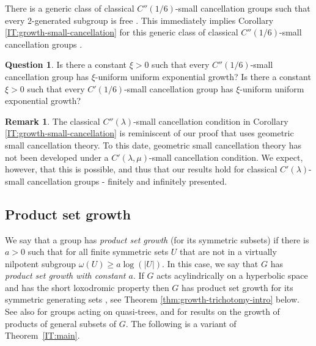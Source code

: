 \documentclass[leqno,a4paper,10pt]{amsart}
\theoremstyle{plain}
\theoremstyle{definition}
\newtheorem{rem}[thm]{Remark}
\newtheorem{quest}[thm]{Question}
\theoremstyle{remark}
\let\ge\geqslant
\begin{document}
There is a generic class of classical $C''(1/6)$-small cancellation groups such that every $2$-generated subgroup is free  \cite{arzhantseva_generality_1996}. This immediately implies Corollary \ref{IT:growth-small-cancellation} for this generic class of classical $C''(1/6)$-small cancellation groups \cite[p. 194]{de_la_harpe_topics_2000}. 

\begin{quest} Is there a constant $\xi>0$ such that every $C''(1/6)$-small cancellation group has $\xi$-uniform uniform exponential growth? Is there a constant $\xi>0$ such that every $C'(1/6)$-small cancellation group has $\xi$-uniform uniform exponential growth? 
\end{quest}

\begin{rem} 
	The classical $C''(\lambda)$-small cancellation condition in Corollary \ref{IT:growth-small-cancellation} is reminiscent of our proof that uses geometric small cancellation theory. To this date, geometric small cancellation theory has not been developed under a  $C'(\lambda,\mu)$-small cancellation condition. We expect, however, that this is possible, and thus that our results hold for classical $C'(\lambda)$-small cancellation groups - finitely and infinitely presented.
\end{rem}

\subsection{Product set growth}
We say that a group has \emph{product set growth} (for its symmetric subsets) if there is $a>0$ such that for all finite symmetric sets $U$ that are not in a virtually nilpotent subgroup $\omega(U)\ge a \log(|U|)$. In this case, we say that $G$ has \emph{product set growth with constant $a$}. If $G$ acts acylindrically on a hyperbolic space and has the short loxodromic property then $G$ has product set growth for its symmetric generating sets \cite[Proposition 2.10]{fujiwara_rates_2021}, see Theorem \ref{thm:growth-trichotomy-intro} below. See also \cite{kerr_product_2021} for groups acting on quasi-trees, and \cite{delzant_product_2020,coulon_product_2022,wan_uniform_2025,fioravanti_product_set_growth_2024} for results on the growth of products of general subsets of $G$. 
 The following is a variant of Theorem~\ref{IT:main}. 
 
\end{document}

